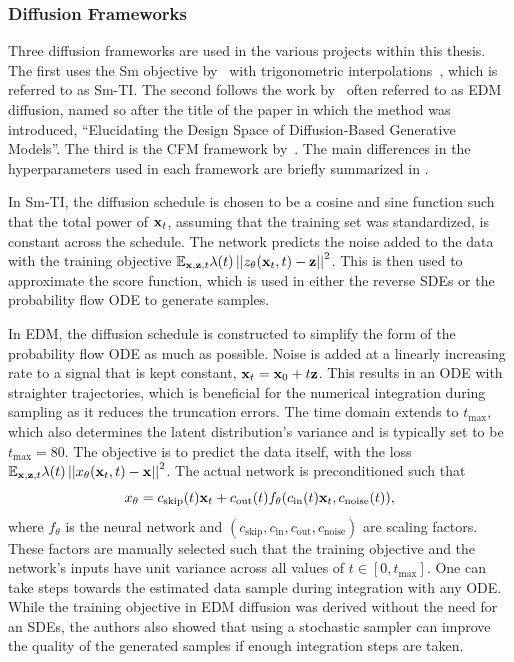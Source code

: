 \subsubsection{Diffusion Frameworks}
\label{sec:diffusion_frameworks}

Three diffusion frameworks are used in the various projects within this thesis.
The first uses the \Gls{Sm} objective by~\textcite{GenerativeModelingEstimating} with trigonometric interpolations~\cite{StochasticInterpolants, ImprovedDenoisingDiffusion}, which is referred to as \Gls{Sm}-TI.
The second follows the work by~\textcite{ElucidatingDesignSpace} often referred to as \Gls{EDM} diffusion, named so after the title of the paper in which the method was introduced, ``Elucidating the Design Space of Diffusion-Based Generative Models''.
The third is the \Gls{CFM} framework by~\textcite{FlowMatchingGenerative, FlowStraightFast, BuildingNormalizingFlows}.
The main differences in the hyperparameters used in each framework are briefly summarized in .

In \Gls{Sm}-TI, the diffusion schedule is chosen to be a cosine and sine function such that the total power of $\mathbf{x}_t$, assuming that the training set was standardized, is constant across the schedule.
The network predicts the noise added to the data with the training objective
$\mathbb{E}_{\mathbf{x}, \mathbf{z}, t} \lambda(t) \left|\left| z_\theta(\mathbf{x}_t, t) - \mathbf{z}\right|\right|^2$.
This is then used to approximate the score function, which is used in either the reverse \Glspl{SDE} or the probability flow \Gls{ODE} to generate samples.

In \Gls{EDM}, the diffusion schedule is constructed to simplify the form of the probability flow \Gls{ODE} as much as possible.
Noise is added at a linearly increasing rate to a signal that is kept constant, $\mathbf{x}_t = \mathbf{x}_0 + t\mathbf{z}$.
This results in an \Gls{ODE} with straighter trajectories, which is beneficial for the numerical integration during sampling as it reduces the truncation errors.
The time domain extends to $t_\text{max}$, which also determines the latent distribution's variance and is typically set to be $t_\text{max} = 80$.
The objective is to predict the data itself, with the loss $\mathbb{E}_{\mathbf{x}, \mathbf{z}, t} \lambda(t) \left|\left| x_\theta(\mathbf{x}_t, t) - \mathbf{x}\right|\right|^2$.
The actual network is preconditioned such that
\begin{equation}
    x_\theta = c_\text{skip}(t) \mathbf{x}_t + c_\text{out}(t)f_\theta(c_\text{in}(t)\mathbf{x}_t, c_\text{noise}(t)),
\end{equation}
where $f_\theta$ is the neural network and $(c_\text{skip}, c_\text{in}, c_\text{out}, c_\text{noise})$ are scaling factors.
These factors are manually selected such that the training objective and the network's inputs have unit variance across all values of $t \in [0, t_\text{max}]$.
One can take steps towards the estimated data sample during integration with any \Gls{ODE}.
While the training objective in \Gls{EDM} diffusion was derived without the need for an \Glspl{SDE}, the authors also showed that using a stochastic sampler can improve the quality of the generated samples if enough integration steps are taken.


